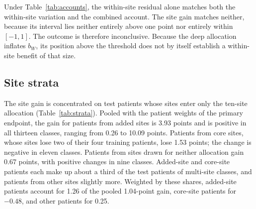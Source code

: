Under Table~\ref{tab:accounts}, the within-site residual alone matches both the within-site variation and the combined account. The site gain matches neither, because its interval lies neither entirely above one point nor entirely within $[-1,1]$. The outcome is therefore inconclusive. Because the deep allocation inflates $b_W$, its position above the threshold does not by itself establish a within-site benefit of that size.

\subsection{Site strata}
The site gain is concentrated on test patients whose sites enter only the ten-site allocation (Table~\ref{tab:strata}). Pooled with the patient weights of the primary endpoint, the gain for patients from added sites is 3.93 points and is positive in all thirteen classes, ranging from 0.26 to 10.09 points. Patients from core sites, whose sites lose two of their four training patients, lose 1.53 points; the change is negative in eleven classes. Patients from sites drawn for neither allocation gain 0.67 points, with positive changes in nine classes. Added-site and core-site patients each make up about a third of the test patients of multi-site classes, and patients from other sites slightly more. Weighted by these shares, added-site patients account for 1.26 of the pooled 1.04-point gain, core-site patients for $-0.48$, and other patients for 0.25.

